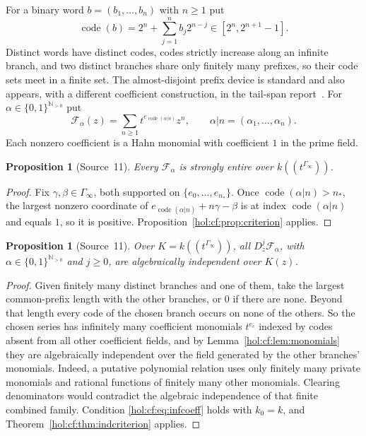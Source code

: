 \documentclass[11pt]{article}
\numberwithin{equation}{section}
\newtheorem{proposition}[theorem]{Proposition}
\theoremstyle{definition}
\theoremstyle{remark}
\newcommand{\N}{\mathbb N}
\newcommand{\code}{\operatorname{code}}
\begin{document}
For a binary word $b=(b_1,\ldots,b_n)$ with $n\ge1$ put
\begin{equation}\label{hol:cf:eq:code}
 \code(b)=2^n+\sum_{j=1}^nb_j2^{n-j}\in[2^n,2^{n+1}-1].
\end{equation}
Distinct words have distinct codes, codes strictly increase along an infinite
branch, and two distinct branches share only finitely many prefixes, so their
code sets meet in a finite set. The almost-disjoint prefix device is standard
and also appears, with a different coefficient construction, in the
tail-span report~\cite{repotail}. For $\alpha\in\{0,1\}^{\N_{>0}}$ put
\begin{equation}\label{hol:cf:eq:branches}
 \mathcal F_\alpha(z)=\sum_{n\ge1}t^{e_{\code(\alpha|n)}}z^n,\qquad
 \alpha|n=(\alpha_1,\ldots,\alpha_n).
\end{equation}
Each nonzero coefficient is a Hahn monomial with coefficient $1$ in the
prime field.

\begin{proposition}[Source~11]\label{hol:cf:prop:branchentire}
Every $\mathcal F_\alpha$ is strongly entire over $k((t^{\Gamma_\infty}))$.
\end{proposition}

\begin{proof}
Fix $\gamma,\beta\in\Gamma_\infty$, both supported on
$\{e_0,\ldots,e_{n_\ast}\}$. Once $\code(\alpha|n)>n_\ast$, the largest nonzero coordinate of
$e_{\code(\alpha|n)}+n\gamma-\beta$ is at index $\code(\alpha|n)$ and equals
$1$, so it is positive. Proposition~\ref{hol:cf:prop:criterion} applies.
\end{proof}

\begin{proposition}[Source~11]\label{hol:cf:prop:branchind}
Over $K=k((t^{\Gamma_\infty}))$, all $D_z^j\mathcal F_\alpha$, with
$\alpha\in\{0,1\}^{\N_{>0}}$ and $j\ge0$, are algebraically independent over
$K(z)$.
\end{proposition}

\begin{proof}
Given finitely many distinct branches and one of them, take the largest
common-prefix length with the other branches, or $0$ if there are none.
Beyond that length every code of the chosen branch occurs on none of the
others. So the chosen series has infinitely many coefficient monomials
$t^{e_c}$ indexed by codes absent from all other coefficient fields, and by
Lemma~\ref{hol:cf:lem:monomials} they are algebraically independent over the
field generated by the other branches' monomials. Indeed, a putative
polynomial relation uses only finitely many private monomials and rational
functions of finitely many other monomials. Clearing denominators would
contradict the algebraic independence of that finite combined family.
Condition \eqref{hol:cf:eq:infcoeff} holds with $k_0=k$, and
Theorem~\ref{hol:cf:thm:indcriterion} applies.
\end{proof}
\end{document}
